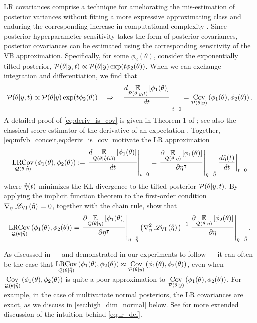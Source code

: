 LR covariances comprise a technique for ameliorating the mis-estimation of
posterior variances without fitting a more expressive approximating class and
enduring the corresponding increase in computational complexity
\citep{giordano:2018:covariances}. Since posterior hyperparameter sensitivity
takes the form of posterior covariances, posterior covariances can be estimated
using the corresponding sensitivity of the VB approximation. Specifically, for
some $\phi_2(\theta)$, consider the exponentially tilted posterior, $\mathcal{P}(\theta
\vert y, t) \propto \mathcal{P}(\theta \vert y) \exp(t \phi_2(\theta))$.  When we can
exchange integration and differentiation, we find that
%
\begin{align}\label{eq:deriv_is_cov}
%
\p(\theta
\vert \y, t) \propto \p(\theta \vert \y) \exp(t \phi_2(\theta))
%
\quad\Rightarrow\quad
%
\fracat{d \expect{\p(\theta \vert \y, t)}{\phi_1(\theta)}}
       {dt}{t=0} = \cov{\p(\theta \vert \y)}{\phi_1(\theta), \phi_2(\theta)}.
%
\end{align}
%
A detailed proof of \cref{eq:deriv_is_cov} is given in Theorem 1 of
\cite{giordano:2018:covariances}; see also the classical score estimator of the
derivative of an expectation \citep{mohamed:2020:mcgradients}.  Together,
\cref{eq:mfvb_conceit,eq:deriv_is_cov} motivate the LR approximation
%
\begin{align}\label{eq:lr_def}
%
\lrcovfull{\q(\theta \vert \etastar)}{\phi_1(\theta), \phi_2(\theta)} :=
\fracat{d \expect{\q(\theta \vert \etastar(t))}{\phi_1(\theta)}}
       {dt}{t=0} =
\fracat{\partial \expect{\q(\theta \vert \eta)}{\phi_1(\theta)}}
       {\partial \eta^\trans}{\eta=\etastar}
\fracat{d \etastar(t)}{d t}{t = 0}
%
\end{align}
%
where $\accentset{*}{\eta}(t)$ minimizes the KL divergence to the tilted posterior
$\mathcal{P}(\theta \vert y, t)$. By applying the implicit function theorem to the
first-order condition $\nabla_{\eta} \left. \mathscr{L}_{\mathrm{VI}}\left(\accentset{*}{\eta}\right) \right. = 0$, together with the
chain rule, \citet{giordano:2018:covariances} show that
%
\begin{align}\label{eq:lr_deriv}
%
\lrcovfull{\q(\theta \vert \etastar)}{\phi_1(\theta), \phi_2(\theta)}
=
\fracat{\partial \expect{\q(\theta \vert \eta)}{\phi_1(\theta)}}
      {\partial\eta^\trans}{\eta=\etastar}
\left(\hess{\eta}{\klfullobj{\etastar}} \right)^{-1}
\fracat{\partial \expect{\q(\theta \vert \eta)}{\phi_2(\theta)}}
     {\partial\eta}{\eta=\etastar}.
%
\end{align}

As discussed in \citet{giordano:2018:covariances} ---
and demonstrated in our experiments to follow --- it can often be the case that
%
$
\underset{\mathcal{Q}(\theta \vert \accentset{*}{\eta})}{\mathrm{LRCov}}\left(\phi_1(\theta), \phi_2(\theta)\right)
\approx \underset{\mathcal{P}(\theta \vert y)}{\mathrm{Cov}}\left(\phi_1(\theta), \phi_2(\theta)\right)
$,
%
even when $\underset{\mathcal{Q}(\theta \vert \accentset{*}{\eta})}{\mathrm{Cov}}\left(\phi_1(\theta), \phi_2(\theta)\right)$ is
quite a poor approximation to $\underset{\mathcal{P}(\theta \vert y)}{\mathrm{Cov}}\left(\phi_1(\theta), \phi_2(\theta)\right)$. For
example, in the case of multivariate normal posteriors, the LR covariances are
exact, as we discuss in \cref{sec:high_dim_normal} below. See
\citet{giordano:2018:covariances} for more extended discussion of the intuition
behind \cref{eq:lr_def}.

